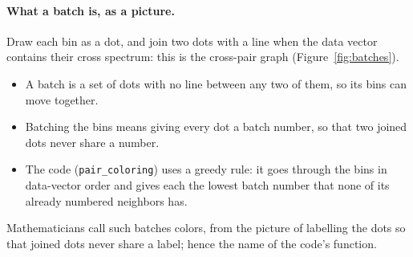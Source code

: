 \documentclass[11pt]{article}
\newcommand{\us}{\_\allowbreak}
\begin{document}
\paragraph{What a batch is, as a picture.}
Draw each bin as a dot, and join two dots with a line when the data
vector contains their cross spectrum: this is the cross-pair graph
(Figure~\ref{fig:batches}).
\begin{itemize}
  \item A batch is a set of dots with no line between any two of them,
    so its bins can move together.
  \item Batching the bins means giving every dot a batch number, so that
    two joined dots never share a number.
  \item The code (\texttt{pair\us coloring}) uses a greedy rule: it goes
    through the bins in data-vector order and gives each the lowest
    batch number that none of its already numbered neighbors has.
\end{itemize}
Mathematicians call such batches colors, from the picture of labelling
the dots so that joined dots never share a label; hence the name of the
code's function.
\end{document}
